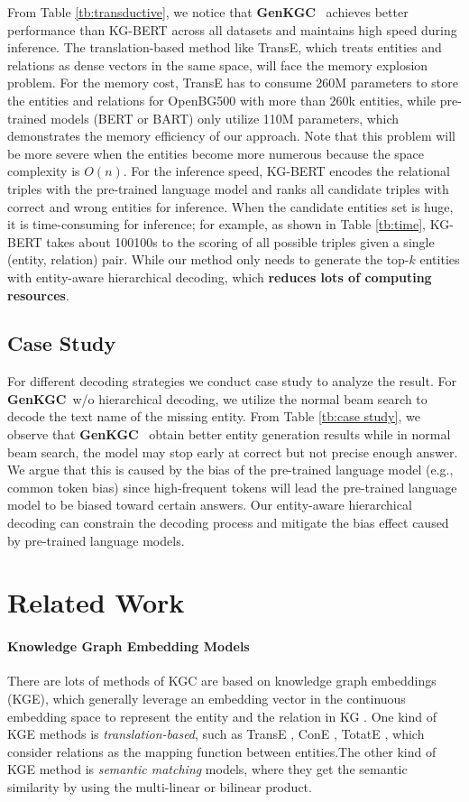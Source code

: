 \documentclass[sigconf]{acmart}
\newcommand{\ours}{\textbf{GenKGC}}
\begin{document}
From Table \ref{tb:transductive}, we notice that \ours~ achieves better performance than KG-BERT \cite{kgbert} across all datasets and maintains high speed during inference.
The translation-based method like TransE, which treats entities and relations as dense vectors in the same space, will face the memory explosion problem.
For the memory cost, TransE has to consume 260M parameters to store the entities and relations for OpenBG500 with more than 260k entities,  
while pre-trained models (BERT or BART) only utilize 110M parameters, which demonstrates the memory efficiency of our approach.
Note that this problem will be more severe when the entities become more numerous because the space complexity is $O(n)$.
For the inference speed, KG-BERT encodes the relational triples with the pre-trained language model and ranks all candidate triples with correct and wrong entities for inference.
When the candidate entities set is huge, it is time-consuming for inference; for example, as shown in Table \ref{tb:time}, KG-BERT takes about 100100s to the scoring of all possible triples given a single (entity, relation) pair. 
While our method only needs to generate the top-$k$ entities with entity-aware hierarchical decoding, which \textbf{reduces lots of computing resources}.




\subsection{Case Study}
For different decoding strategies we conduct case study to analyze the result.
For \ours~w/o hierarchical decoding, we utilize the normal beam search to decode the text name of the missing entity.
From Table \ref{tb:case study}, we observe that \ours~ obtain better entity generation results while in normal beam search, the model may stop early at correct but not precise enough answer.
We argue that this is caused by the bias of the pre-trained language model (e.g., common token bias) since high-frequent tokens will lead the pre-trained language model to be biased toward certain answers.
Our entity-aware hierarchical decoding can constrain the decoding process and mitigate the bias effect caused by pre-trained language models. 


\section{Related Work}
\paragraph{Knowledge Graph Embedding Models}
There are lots of methods of KGC are based on knowledge graph embeddings (KGE), which generally leverage an embedding vector in the continuous embedding space to represent the entity and the relation in KG \cite{DBLP:conf/www/ZhangDSCZC20}.
One kind of KGE methods is \textit{translation-based}, such as TransE \cite{Bordes:TransE},  ConE \cite{zhang2021cone}, TotatE \cite{RotatE},  which consider relations as the mapping function between entities.The other kind of KGE method is \textit{semantic matching} models, where they get the semantic similarity by using the multi-linear or bilinear product.
\end{document}

